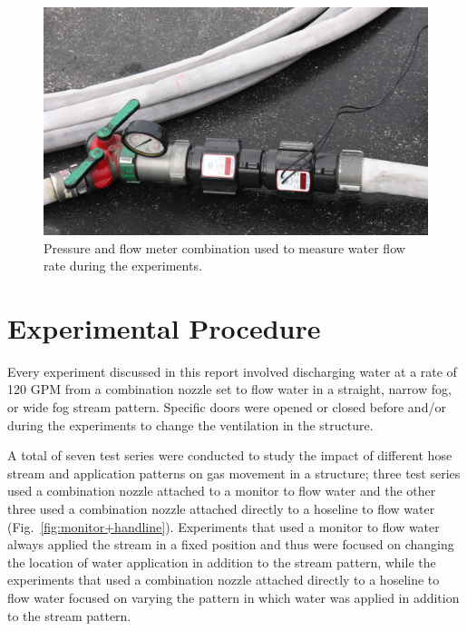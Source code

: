 \documentclass[12pt,oneside]{book}
\begin{document}
\begin{figure}[!ht]
	\includegraphics[width=\columnwidth]{../Figures/Pictures/flow_meter}
	\caption[Flow meter used to measure flow rate during experiments.]{Pressure and flow meter combination used to measure water flow rate during the experiments.}
	\label{fig:flow_meter}
\end{figure}
\FloatBarrier

\section{Experimental Procedure}
\label{sec:exp_procedure}
Every experiment discussed in this report involved discharging water at a rate of 120 GPM from a combination nozzle set to flow water in a straight, narrow fog, or wide fog stream pattern. Specific doors were opened or closed before and/or during the experiments to change the ventilation in the structure. 

A total of seven test series were conducted to study the impact of different hose stream and application patterns on gas movement in a structure; three test series used a combination nozzle attached to a monitor to flow water and the other three used a combination nozzle attached directly to a hoseline to flow water (Fig.~\ref{fig:monitor+handline}). Experiments that used a monitor to flow water always applied the stream in a fixed position and thus were focused on changing the location of water application in addition to the stream pattern, while the experiments that used a combination nozzle attached directly to a hoseline to flow water focused on varying the pattern in which water was applied in addition to the stream pattern.
\end{document}
